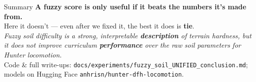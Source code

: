 \documentclass[aspectratio=169]{beamer}
\begin{document}
\begin{frame}{Summary}
  \centering
  \Large \textbf{A fuzzy score is only useful if it beats the numbers it's made from.}\\[10pt]
  \normalsize Here it doesn't — even after we fixed it, the best it does is \textbf{tie}.\\[8pt]
  \footnotesize \textit{Fuzzy soil difficulty is a strong, interpretable \textbf{description} of
  terrain hardness, but it does not improve curriculum \textbf{performance} over the raw soil
  parameters for Hunter locomotion.}\\[14pt]
  \footnotesize
  Code \& full write-ups: \texttt{docs/experiments/fuzzy\_soil\_UNIFIED\_conclusion.md};
  models on Hugging Face \texttt{anhrisn/hunter-dfh-locomotion}.
\end{frame}
\end{document}
